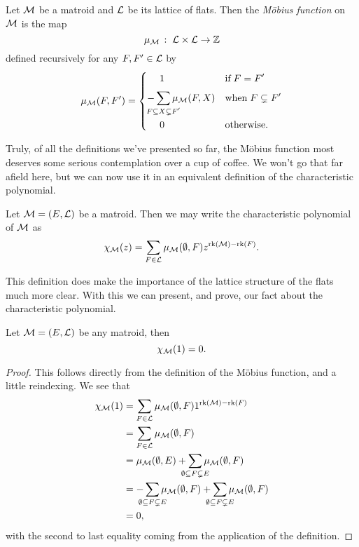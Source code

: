 \documentclass[12pt,oneside]{../../sfsuthesis}
\begin{document}
\begin{definition}\label{def:mobiusFunc}
    Let \( \mathcal{M} \) be a matroid and \( \mathcal{L} \) be its lattice of flats.
    Then the \emph{M\"obius function} on \( \mathcal{M} \) is the map
    \[
        \mu_{\mathcal{M}} \,:\; \mathcal{L} \times \mathcal{L} \to \mathbb{Z}
    \]
    defined recursively for any \( F, F' \in \mathcal{L} \) by
    \[
        \mu_\cM(F, F') =
        \begin{dcases}
            \quad\; 1 \vphantom{\sum}                                    & \text{if}\; F = F'            \\
            - \sum_{\mathclap{F \subseteq X \subsetneq F'}}\mu_\cM(F, X) & \text{when}\; F \subsetneq F' \\
            \quad\; 0                                                    & \text{otherwise}.
        \end{dcases}
    \]
\end{definition}
Truly, of all the definitions we've presented so far, the M\"obius function most deserves some serious contemplation over a cup of coffee.
We won't go that far afield here, but we can now use it in an equivalent definition of the characteristic polynomial.
\begin{definition}
    Let \( \mathcal{M} = (E, \mathcal{L}) \) be a matroid.
    Then we may write the characteristic polynomial of \( \mathcal{M} \) as
    \[
        \chi_{\mathcal{M}}(z) = \sum_{F \in \mathcal{L}} \mu_{\mathcal{M}}(\emptyset, F) z^{\operatorname{rk}(\mathcal{M}) - \operatorname{rk}(F)}.
    \]
\end{definition}
This definition does make the importance of the lattice structure of the flats much more clear.
With this we can present, and prove, our fact about the characteristic polynomial.
\begin{proposition}\th\label{prop:charOfOneIsZero}
    Let \( \mathcal{M} = (E, \mathcal{L}) \) be any matroid, then
    \[
        \chi_{\mathcal{M}}(1) = 0.
    \]
\end{proposition}
\begin{proof}
    This follows directly from the definition of the M\"obius function, and a little reindexing.
    We see that
    \begin{align*}
        \chi_\cM(1) & = \sum_{F \in \cL} \mu_\cM(\emptyset, F) 1^{\rk(\cM) - \rk(F)}                                                                                             \\
                    & =  \sum_{F \in \cL} \mu_\cM(\emptyset, F)                                                                                                                  \\
                    & = \mu_\cM(\emptyset, E) +  \sum_{\mathclap{\emptyset \subseteq F \subsetneq E}} \mu_\cM(\emptyset, F)                                                      \\
                    & = -\sum_{\mathclap{\emptyset \subseteq F \subsetneq E}} \mu_\cM(\emptyset, F) + \sum_{\mathclap{\emptyset \subseteq F \subsetneq E}} \mu_\cM(\emptyset, F) \\
                    & = 0,
    \end{align*}
    with the second to last equality coming from the application of the definition.
\end{proof}
\end{document}
